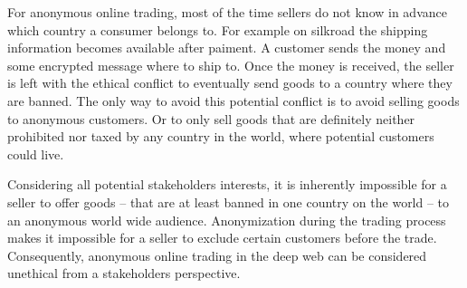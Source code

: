 For anonymous online trading, most of the time sellers do not know in advance which country a consumer belongs to. For example on silkroad the shipping information becomes available after paiment. A customer sends the money and some encrypted message where to ship to\cite{silkroad2013}. Once the money is received, the seller is left with the ethical conflict to eventually send goods to a country where they are banned. The only way to avoid this potential conflict is to avoid selling goods to anonymous customers. Or to only sell goods that are definitely neither prohibited nor taxed by any country in the world, where potential customers could live.

Considering all potential stakeholders interests, it is inherently impossible for a seller to offer goods -- that are at least banned in one country on the world -- to an anonymous world wide audience. Anonymization during the trading process makes it impossible for a seller to exclude certain customers before the trade. Consequently, anonymous online trading in the deep web can be considered unethical from a stakeholders perspective.